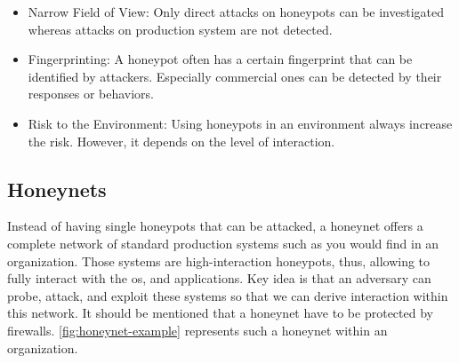 \begin{itemize}
    \item Narrow Field of View: Only direct attacks on honeypots can be investigated whereas attacks on production system are not detected.
    \item Fingerprinting: A honeypot often has a certain fingerprint that can be identified by attackers.
          Especially commercial ones can be detected by their responses or behaviors.
    \item Risk to the Environment: Using honeypots in an environment always increase the risk.
          However, it depends on the level of interaction.
\end{itemize}

\subsection{Honeynets}

Instead of having single honeypots that can be attacked, a honeynet offers a complete network of standard production systems such as you would find in an organization.
Those systems are high-interaction honeypots, thus, allowing to fully interact with the \ac{os}, and applications.
Key idea is that an adversary can probe, attack, and exploit these systems so that we can derive interaction within this network.
It should be mentioned that a honeynet have to be protected by firewalls.
\autoref{fig:honeynet-example} represents such a honeynet within an organization.

